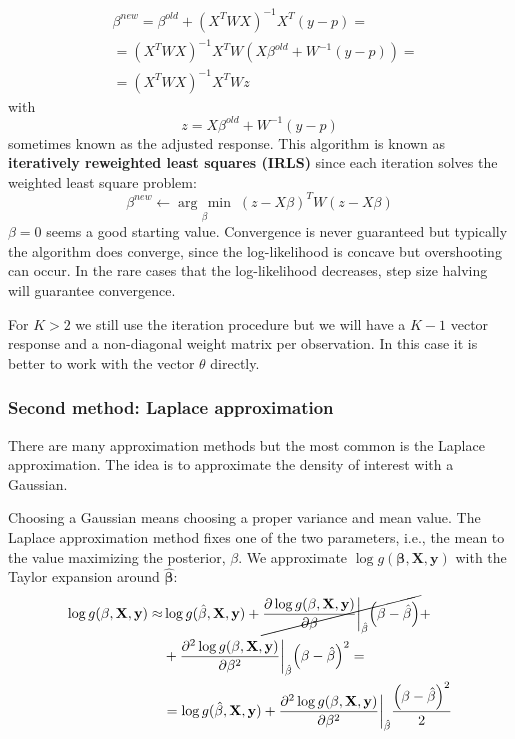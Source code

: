 \documentclass[12pt, letterpaper]{article}
\theoremstyle{definition}
\newcommand{\X}{\mathrm{\mathbf{X}}}
\newcommand{\y}{\mathbf{y}}
\newcommand{\be}{\mathbf{\beta}}
\newcommand{\hbe}{\hat{\mathbf{\beta}}}
\DeclarePairedDelimiter\autobracket{(}{)}
\newcommand{\br}[1]{\autobracket*{#1}}
\newcommand{\argmin}[1]{\underset{#1}{\operatorname{arg}\,\operatorname{min}}\;}
\begin{document}
\begin{equation}
\begin{aligned}
&\beta^{new} = \beta^{old} +(X^TWX)^{-1}X^T(y-p) = \\
&=(X^TWX)^{-1}X^TW\left(X\beta^{old}+W^{-1} \left(y-p\right)\right) =\\
&= \left(X^TWX\right)^{-1} X^TWz
\end{aligned}
\end{equation}
with
\begin{equation}
z = X\beta^{old}+ W^{-1} (y-p)
\end{equation}
sometimes known as the adjusted response. This algorithm is known as \textbf{iteratively reweighted least squares (IRLS)} since each iteration solves the weighted least square problem:
\begin{equation}
\beta^{new} \leftarrow \argmin{\beta}{\left(z-X\beta\right)^TW\left(z-X\beta\right)}
\end{equation}
$\beta=0$ seems a good starting value. Convergence is never guaranteed but typically the algorithm does converge, since the log-likelihood is concave but overshooting can occur. In the rare cases that the log-likelihood decreases, step size halving will guarantee convergence.

For $K>2$ we still use the iteration procedure but we will have a $K-1$ vector response and a non-diagonal weight matrix per observation. In this case it is better to work with the vector $\theta$ directly.

\subsubsection{Second method: Laplace approximation}
There are many approximation methods but the most common is the Laplace approximation. The idea is to approximate the density of interest with a Gaussian.

Choosing a Gaussian means choosing a proper variance and mean value. The Laplace approximation method fixes one of the two parameters, i.e., the mean to the value maximizing the posterior, $\beta$. We approximate $\log g(\be,\X,\y)$ with the Taylor expansion around $\hat{\be}$:
\begin{equation}
\label{Taylor}
\begin{aligned}
\log g(\be,\X,\y) \approx &\log g(\hbe,\X,\y) + \cancel{\frac{ \partial \log g(\be,\X,\y)}{\partial \be}\bigg\rvert_{\hbe}\br{\be -\hbe}} + \\
&+ \frac{ \partial^2 \log g(\be,\X,\y)}{\partial \be^2}\bigg\rvert_{\hbe}\br{\be -\hbe}^2 =\\
&=\log g(\hbe,\X,\y)+ \frac{ \partial^2 \log g(\be,\X,\y)}{\partial \be^2}\bigg\rvert_{\hbe}\frac{\br{\be -\hbe}^2}{2}
\end{aligned}
\end{equation}
\end{document}

